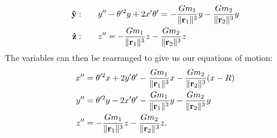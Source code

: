 \begin{samepage}
\begin{align*}
	\uvec{y} : \qquad &y'' - \theta'^2y + 2x'\theta' = -\frac{Gm_1}{\|\bvec{r}_1\|^3}y - \frac{Gm_2}{\|\bvec{r}_2\|^3}y \\
	\uvec{z} : \qquad &z'' = -\frac{Gm_1}{\|\bvec{r}_1\|^3}z - \frac{Gm_2}{\|\bvec{r}_2\|^3}z
\end{align*}
The variables can then be rearranged to give us our equations of motion:
\begin{align}
	x'' &= \theta'^2x + 2y'\theta' -\frac{Gm_1}{\|\bm{\mathbf{r}}_1\|^3}x - \frac{Gm_2}{\|\bm{\mathbf{r}}_2\|^3}(x - R) \label{eqn:eomx}\\
	y'' &= \theta'^2y - 2x'\theta' -\frac{Gm_1}{\|\bm{\mathbf{r}}_1\|^3}y - \frac{Gm_2}{\|\bm{\mathbf{r}}_2\|^3}y \label{eqn:eomy}\\
	z'' &= -\frac{Gm_1}{\|\bm{\mathbf{r}}_1\|^3}z - \frac{Gm_2}{\|\bm{\mathbf{r}}_2\|^3}z \label{eqn:eomz}\text{.}
\end{align}
\end{samepage}
